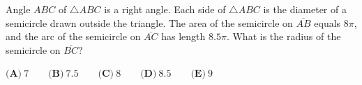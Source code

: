 Angle $ABC$ of $\triangle ABC$ is a right angle. Each side of $\triangle ABC$ is the diameter of a semicircle drawn outside the triangle. The area of the semicircle on $\overline{AB}$ equals $8\pi$, and the arc of the semicircle on $\overline{AC}$ has length $8.5\pi$. What is the radius of the semicircle on $\overline{BC}$?

$\textbf{(A)}\ 7 \qquad \textbf{(B)}\ 7.5 \qquad \textbf{(C)}\ 8 \qquad \textbf{(D)}\ 8.5 \qquad \textbf{(E)}\ 9$
